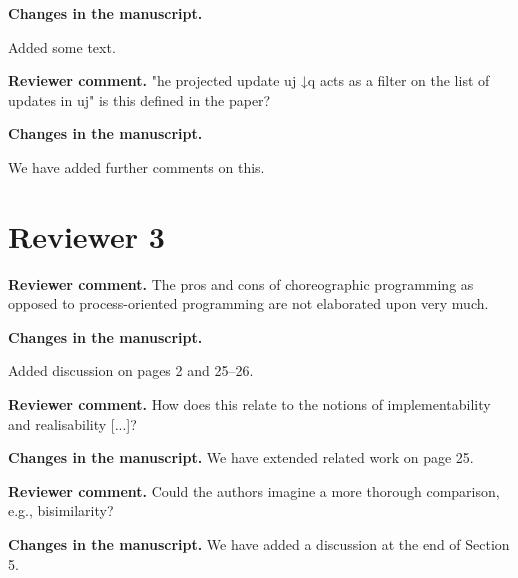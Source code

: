 \documentclass[11pt]{article}
\newcommand{\revcomment}[1]{%
  \begin{reviewercomment}
  \textbf{Reviewer comment.} #1
  \end{reviewercomment}
}
\newcommand{\revchanges}[2][]{%
  \par\noindent\textbf{Changes in the manuscript.} #1
  #2\par\bigskip
}
\begin{document}
\revchanges{
 Added some text. 
}


\revcomment{
  "he projected update uj ↓q acts as a filter on the list of updates in uj" is this defined in the paper?
}


\revchanges{
  We have added further comments on this. 
}



\newpage

\section*{Reviewer 3}


\revcomment{
The pros and cons of choreographic programming as opposed to process-oriented
programming are not elaborated upon very much.
}

\revchanges{
Added discussion on pages 2 and 25--26.
}




\revcomment{
How does this relate to the notions of implementability and realisability [...]?
}

\revchanges{ We have extended related work on page 25.  }

\revcomment{ Could the authors imagine a more thorough comparison,
  e.g., bisimilarity?  }

\revchanges{ We have added a discussion at the end of Section 5.  }
\end{document}
